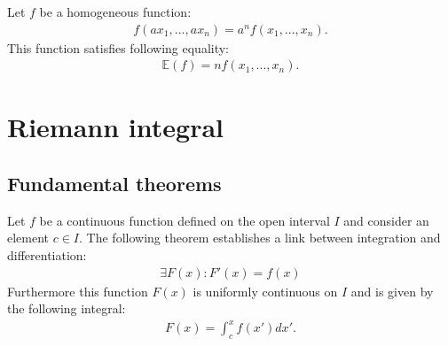    \begin{theorem}[Euler]\label{calculus:theorem:euler_homogeneous_functions}
        Let $f$ be a homogeneous function:
        \begin{gather}
            f(ax_1, ..., ax_n) = a^nf(x_1, ..., x_n).
        \end{gather}
        This function satisfies following equality:
        \begin{gather}
            \mathbb{E}(f) = nf(x_1, ..., x_n).
        \end{gather}
    \end{theorem}

\section{Riemann integral}


\subsection{Fundamental theorems}

    \begin{theorem}
        Let $f$ be a continuous  function defined on the open interval $I$ and consider an element $c \in I$. The following theorem establishes a link between integration and differentiation:
        \begin{gather}
            \exists F(x) :F'(x) = f(x)
        \end{gather}
        Furthermore this function $F(x)$ is uniformly continuous on $I$ and is given by the following integral:
        \begin{gather}
            \label{calculus:first_fundamental_theorem}
            F(x) = \int_c^xf(x')dx'.
        \end{gather}
    \end{theorem}

